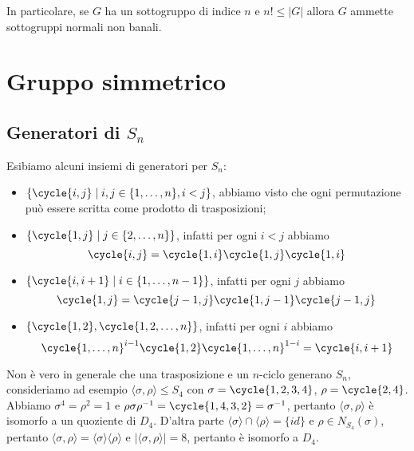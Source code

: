 \documentclass[11pt]{scrartcl}
\begin{document}
\begin{remark}
    In particolare, se $G$ ha un sottogruppo di indice $n$ e $n! \leqslant |G|$
    allora $G$ ammette sottogruppi normali non banali.
\end{remark}

\newpage

\section{Gruppo simmetrico}

\subsection{Generatori di $S_n$}

Esibiamo alcuni insiemi di generatori per $S_n$:

\begin{itemize}
    \item $\{\cycle{i, j} \mid i, j \in\{1, \ldots, n\}, i < j\}$, abbiamo visto 
    che ogni permutazione può essere scritta come prodotto di trasposizioni;
    \item $\{\cycle{1, j}\mid j \in \{2, \ldots, n\}\}$, infatti per ogni $i<j$ abbiamo
    \[
        \cycle{i, j} = \cycle{1, i}\cycle{1, j}\cycle{1, i}
    \]
    \item $\{\cycle{i, i + 1}\mid i \in\{1, \ldots, n - 1\}\}$,
    infatti per ogni $j$ abbiamo 
    \[
        \cycle{1, j} = \cycle{j - 1, j}\cycle{1, j - 1}\cycle{j - 1, j}
    \]
    \item $\{\cycle{1, 2}, \cycle{1, 2, \ldots, n}\}$, infatti per ogni
    $i$ abbiamo 
    \[
        \cycle{1, \ldots, n}^{i - 1}\cycle{1, 2}\cycle{1, \ldots, n}^{1 - i} = 
        \cycle{i, i + 1}
    \]
\end{itemize}

\begin{remark}
    Non è vero in generale che una trasposizione e un $n$-ciclo generano $S_n$,
    consideriamo ad esempio $\langle\sigma, \rho\rangle\leqslant S_4$ con
    $\sigma = \cycle{1, 2, 3, 4}$, $\rho = \cycle{2, 4}$. Abbiamo
    $\sigma^4 = \rho^2 = 1$ e $\rho\sigma\rho^{-1} = \cycle{1, 4, 3, 2} =
    \sigma^{-1}$, pertanto $\langle\sigma, \rho\rangle$ è isomorfo a un 
    quoziente di $D_4$. D'altra parte $\langle\sigma\rangle\cap \langle\rho\rangle = \{id\}$
    e $\rho \in N_{S_4}(\sigma)$, pertanto $\langle\sigma, \rho\rangle =
    \langle\sigma\rangle\langle\rho\rangle$ e $|\langle\sigma, \rho\rangle| = 8$,
    pertanto è isomorfo a $D_4$. 
\end{remark}
\end{document}
